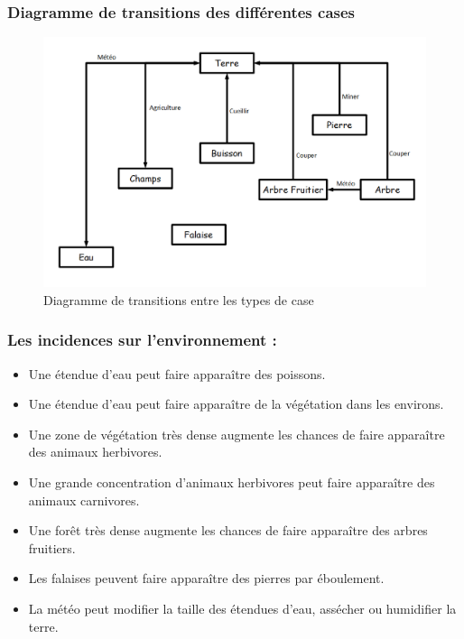 \documentclass[a4paper]{memoir}
\begin{document}
				\subsubsection{Diagramme de transitions des différentes cases}
					\begin{figure}[H]
						\begin{center}
							\includegraphics[scale=0.35]{img/DiagrammeTransitionCases.png} 
						\end{center}
						\label{fig:case}
						\caption{Diagramme de transitions entre les types de case}
					\end{figure}
			
				\subsubsection{Les incidences sur l'environnement :}
					\begin{itemize}[label=$\bullet$]
						\item Une étendue d'eau peut faire apparaître des poissons.
						\item Une étendue d'eau peut faire apparaître de la végétation dans les environs.
						\item Une zone de végétation très dense augmente les chances de faire apparaître des animaux herbivores.
						\item Une grande concentration d'animaux herbivores peut faire apparaître des animaux carnivores.
						\item Une forêt très dense augmente les chances de faire apparaître des arbres fruitiers.
						\item Les falaises peuvent faire apparaître des pierres par éboulement.
						\item La météo peut modifier la taille des étendues d'eau, assécher ou humidifier la terre.
					\end{itemize}
				
\end{document}
